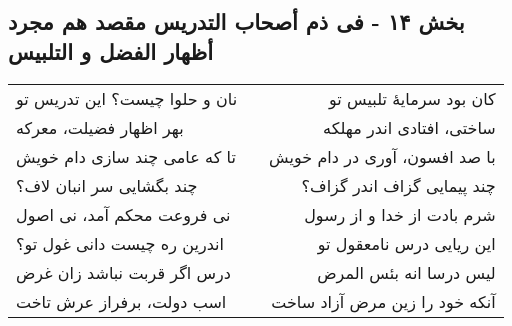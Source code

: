 \begin{center}
\section*{بخش ۱۴ - فی ذم أصحاب التدریس مقصد هم مجرد أظهار الفضل و التلبیس}
\label{sec:014}
\begin{longtable}{l p{0.5cm} r}
نان و حلوا چیست؟ این تدریس تو
&&
کان بود سرمایهٔ تلبیس تو
\\
بهر اظهار فضیلت، معرکه
&&
ساختی، افتادی اندر مهلکه
\\
تا که عامی چند سازی دام خویش
&&
با صد افسون، آوری در دام خویش
\\
چند بگشایی سر انبان لاف؟
&&
چند پیمایی گزاف اندر گزاف؟
\\
نی فروعت محکم آمد، نی اصول
&&
شرم بادت از خدا و از رسول
\\
اندرین ره چیست دانی غول تو؟
&&
این ریایی درس نامعقول تو
\\
درس اگر قربت نباشد زان غرض
&&
لیس درسا انه بئس المرض
\\
اسب دولت، برفراز عرش تاخت
&&
آنکه خود را زین مرض آزاد ساخت
\\
\end{longtable}
\end{center}
